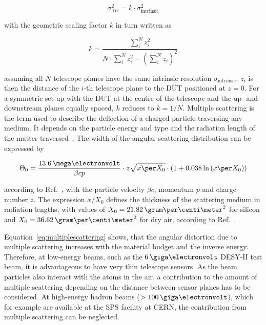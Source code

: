 \begin{equation}
\label{eq:telescopepointing}
\sigma_{\textrm{Tel}}^2 = k \cdot \sigma_{\textrm{intrinsic}}^2
\end{equation}

\noindent with the geometric scaling factor $k$ in turn written as

\begin{equation}
k = \frac{\sum_i^N z_i^2}{N \cdot \sum_i^N z_i^2 - \left( \sum_i^N z_i
\right)^2}
\end{equation}

\noindent assuming all $N$ telescope planes have the same intrinsic resolution $\sigma_{\textrm{intrinsic}}$. 
$z_i$ is then the distance of the $i$-th telescope plane to the DUT positioned at $z=0$.
For a symmetric set-up with the DUT at the centre of the telescope and the up- and downstream planes equally spaced, $k$ reduces to $k = 1/N$. 
Multiple scattering is the term used to describe the deflection of a charged particle traversing any medium.
It depends on the particle energy and type and the radiation length of the matter traversed~\cite{ref:scatteringhighland}.
The width of the angular scattering distribution can be expressed by

\begin{equation}
\label{eq:multiplescattering}
\Theta_{0} = \frac{13.6\,\mega\electronvolt}{\beta c p} \cdot z
\sqrt{x \per X_0}
\cdot \left( 1 + 0.038 \ln{\left( x \per X_0\right) } \right)
\end{equation}

according to Ref.~\cite{ref:PDG-2014}, with the particle velocity $\beta c$, momentum $p$ and charge number $z$. 
The expression $x/X_0$ defines the thickness of the scattering medium in radiation lengths,
 with values of $X_0 = 21.82\,\allowbreak\gram\per\centi\meter^2$ for silicon and $X_0 = 36.62\,\gram\per\centi\meter^2$ for dry air, according to Ref.~\cite{ref:x0values}.

Equation~\ref{eq:multiplescattering} shows, that the angular distortion due to multiple scattering increases with the material budget and the inverse energy.
Therefore, at low-energy beams, such as the $6\,\giga\electronvolt$ DESY-II test beam, it is advantageous to have very thin telescope sensors. 
As the beam particles also interact with the atoms in the air, a contribution to the amount of multiple scattering depending on the distance between sensor planes has to be considered. 
At high-energy hadron beams ($> 100\,\giga\electronvolt$), which for example are available at the SPS facility at CERN, the contribution from multiple scattering can be neglected.

